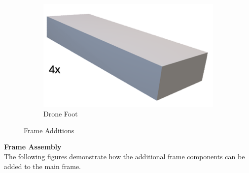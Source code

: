 \begin{figure}[H]
\begin{subfigure}[b]{0.45\textwidth}
    \end{subfigure}
    \vspace{0.5cm} 
    \begin{subfigure}[b]{0.2\textwidth}
        \centering
        \includegraphics[width=\textwidth]{img/assembly-5b.png}
        \caption{Drone Foot}
    \end{subfigure}
    \caption{Frame Additions}
\end{figure}




\pagebreak
\textbf{Frame Assembly} \\
The following figures demonstrate how the additional frame components can be added to the main frame.

